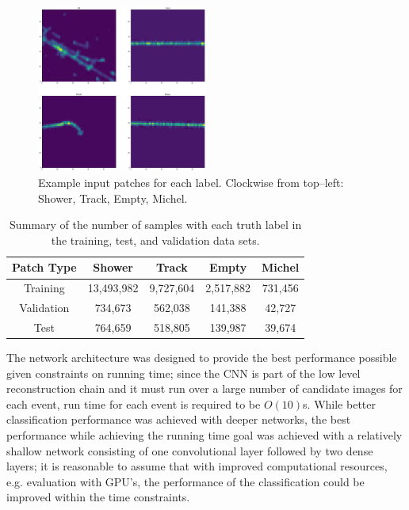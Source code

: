 \begin{figure}[h]
	\centering
	\includegraphics[width=0.5\textwidth]{figures/patch_examples.pdf}  
	\caption[Example CNN input images.]{Example input patches for
	each label. Clockwise from top--left: Shower, Track, Empty, Michel.}
	\label{fig:patches}
\end{figure}

\begin{table}[h]
	\centering
	\begin{tabular}{c|c|c|c|c}
		Patch Type & Shower     & Track     & Empty     & Michel  \\ \hline
		Training   & 13,493,982 & 9,727,604 & 2,517,882 & 731,456 \\
		Validation & 734,673    & 562,038   & 141,388   & 42,727  \\
		Test       & 764,659    & 518,805   & 139,987   & 39,674 
	\end{tabular}
	\caption[Number of patches with each truth label.]{Summary of the number of
	samples with each truth label in the training, test, and validation data
	sets.}
	\label{tab:patches}
\end{table}

The network architecture was designed to provide the best performance possible
given constraints on running time; since the CNN is part of the low level
reconstruction chain and it must run over a large number of candidate images for
each event, run time for each event is required to be \(O(10)\)s. While better
classification performance was achieved with deeper networks, the best
performance while achieving the running time goal was achieved with a relatively
shallow network consisting of one convolutional layer followed by two dense
layers; it is reasonable to assume that with improved computational resources,
e.g. evaluation with GPU's, the performance of the classification could be
improved within the time constraints. 

